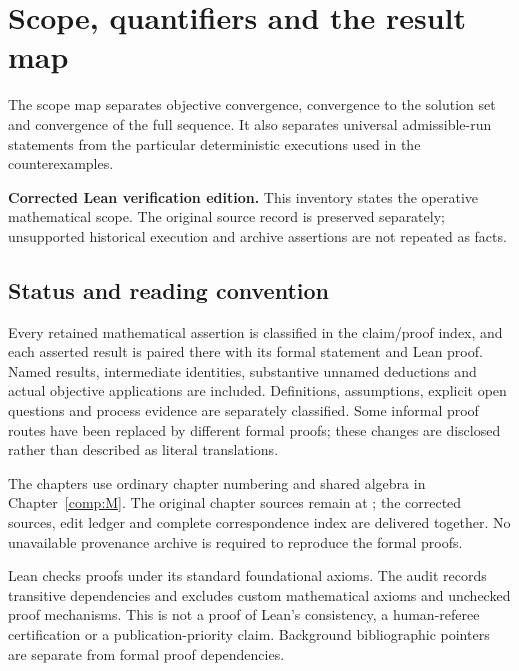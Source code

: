 \chapter{Scope, quantifiers and the result map}\label{comp:I}\label{I:chapter}
\renewcommand{\ModuleTag}{1}
The scope map separates objective convergence, convergence to the solution set and convergence of the full sequence. It also separates universal admissible-run statements from the particular deterministic executions used in the counterexamples.



\textbf{Corrected Lean verification edition.} This inventory states the operative mathematical scope. The original source record is preserved separately; unsupported historical execution and archive assertions are not repeated as facts.

\section*{Status and reading convention}\label{status-and-reading-convention}


Every retained mathematical assertion is classified in the claim/proof index, and each asserted result is paired there with its formal statement and Lean proof. Named results, intermediate identities, substantive unnamed deductions and actual objective applications are included. Definitions, assumptions, explicit open questions and process evidence are separately classified. Some informal proof routes have been replaced by different formal proofs; these changes are disclosed rather than described as literal translations.

The chapters use ordinary chapter numbering and shared algebra in Chapter~\ref{comp:M}. The original chapter sources remain at ; the corrected sources, edit ledger and complete correspondence index are delivered together. No unavailable provenance archive is required to reproduce the formal proofs.

Lean checks proofs under its standard foundational axioms. The audit records transitive dependencies and excludes custom mathematical axioms and unchecked proof mechanisms. This is not a proof of Lean's consistency, a human-referee certification or a publication-priority claim. Background bibliographic pointers are separate from formal proof dependencies.




